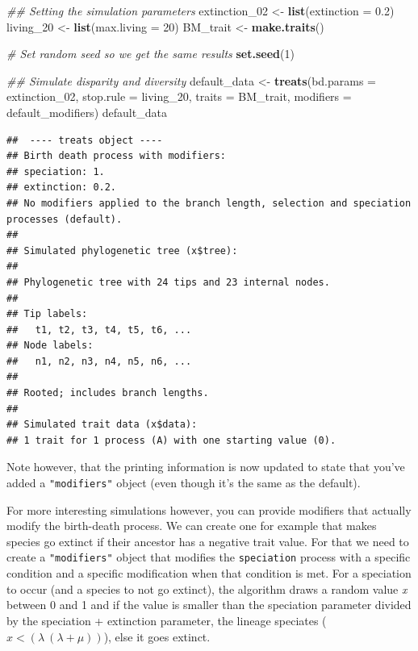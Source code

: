 \documentclass[
]{book}
\newenvironment{Shaded}{\begin{snugshade}}{\end{snugshade}}
\newcommand{\CommentTok}[1]{\textcolor[rgb]{0.56,0.35,0.01}{\textit{#1}}}
\newcommand{\DataTypeTok}[1]{\textcolor[rgb]{0.13,0.29,0.53}{#1}}
\newcommand{\DecValTok}[1]{\textcolor[rgb]{0.00,0.00,0.81}{#1}}
\newcommand{\FloatTok}[1]{\textcolor[rgb]{0.00,0.00,0.81}{#1}}
\newcommand{\KeywordTok}[1]{\textcolor[rgb]{0.13,0.29,0.53}{\textbf{#1}}}
\newcommand{\NormalTok}[1]{#1}
\newcommand{\StringTok}[1]{\textcolor[rgb]{0.31,0.60,0.02}{#1}}
\begin{document}
\begin{Shaded}
\begin{Highlighting}[]
\CommentTok{\#\# Setting the simulation parameters}
\NormalTok{extinction\_}\DecValTok{02}\NormalTok{ \textless{}{-}}\StringTok{ }\KeywordTok{list}\NormalTok{(}\DataTypeTok{extinction =} \FloatTok{0.2}\NormalTok{)}
\NormalTok{living\_}\DecValTok{20}\NormalTok{     \textless{}{-}}\StringTok{ }\KeywordTok{list}\NormalTok{(}\DataTypeTok{max.living =} \DecValTok{20}\NormalTok{)}
\NormalTok{BM\_trait      \textless{}{-}}\StringTok{ }\KeywordTok{make.traits}\NormalTok{()}

\CommentTok{\# Set random seed so we get the same results}
\KeywordTok{set.seed}\NormalTok{(}\DecValTok{1}\NormalTok{)}

\CommentTok{\#\# Simulate disparity and diversity}
\NormalTok{default\_data \textless{}{-}}\StringTok{ }\KeywordTok{treats}\NormalTok{(}\DataTypeTok{bd.params =}\NormalTok{ extinction\_}\DecValTok{02}\NormalTok{,}
                     \DataTypeTok{stop.rule =}\NormalTok{ living\_}\DecValTok{20}\NormalTok{,}
                     \DataTypeTok{traits    =}\NormalTok{ BM\_trait,}
                     \DataTypeTok{modifiers =}\NormalTok{ default\_modifiers)}
\NormalTok{default\_data}
\end{Highlighting}
\end{Shaded}

\begin{verbatim}
##  ---- treats object ---- 
## Birth death process with modifiers:
## speciation: 1.
## extinction: 0.2.
## No modifiers applied to the branch length, selection and speciation processes (default).
## 
## Simulated phylogenetic tree (x$tree):
## 
## Phylogenetic tree with 24 tips and 23 internal nodes.
## 
## Tip labels:
##   t1, t2, t3, t4, t5, t6, ...
## Node labels:
##   n1, n2, n3, n4, n5, n6, ...
## 
## Rooted; includes branch lengths.
## 
## Simulated trait data (x$data):
## 1 trait for 1 process (A) with one starting value (0).
\end{verbatim}

Note however, that the printing information is now updated to state that you've added a \texttt{"modifiers"} object (even though it's the same as the default).

For more interesting simulations however, you can provide modifiers that actually modify the birth-death process.
We can create one for example that makes species go extinct if their ancestor has a negative trait value.
For that we need to create a \texttt{"modifiers"} object that modifies the \texttt{speciation} process with a specific condition and a specific modification when that condition is met.
For a speciation to occur (and a species to not go extinct), the algorithm draws a random value \emph{x} between 0 and 1 and if the value is smaller than the speciation parameter divided by the speciation + extinction parameter, the lineage speciates (\(x < (\lambda \ (\lambda + \mu))\)), else it goes extinct.
\end{document}
